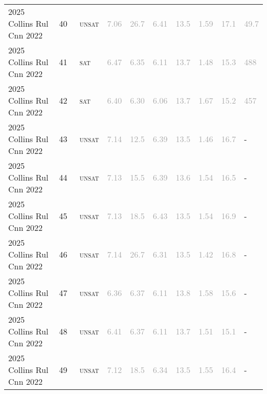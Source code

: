 \begin{center}
{\begin{longtable}{@{}llllllllll@{}}
2025 Collins Rul Cnn 2022 & 40 & ~\textsc{unsat} & \textcolor{darkgray}{7.06} & \textcolor{darkgray}{26.7} & \textcolor{darkgray}{6.41} & \textcolor{darkgray}{13.5} & \textcolor{darkgray}{1.59} & \textcolor{darkgray}{17.1} & \textcolor{darkgray}{49.7} \\
2025 Collins Rul Cnn 2022 & 41 & ~\textsc{sat} & \textcolor{darkgray}{6.47} & \textcolor{darkgray}{6.35} & \textcolor{darkgray}{6.11} & \textcolor{darkgray}{13.7} & \textcolor{darkgray}{1.48} & \textcolor{darkgray}{15.3} & \textcolor{darkgray}{488} \\
2025 Collins Rul Cnn 2022 & 42 & ~\textsc{sat} & \textcolor{darkgray}{6.40} & \textcolor{darkgray}{6.30} & \textcolor{darkgray}{6.06} & \textcolor{darkgray}{13.7} & \textcolor{darkgray}{1.67} & \textcolor{darkgray}{15.2} & \textcolor{darkgray}{457} \\
2025 Collins Rul Cnn 2022 & 43 & ~\textsc{unsat} & \textcolor{darkgray}{7.14} & \textcolor{darkgray}{12.5} & \textcolor{darkgray}{6.39} & \textcolor{darkgray}{13.5} & \textcolor{darkgray}{1.46} & \textcolor{darkgray}{16.7} & - \\
2025 Collins Rul Cnn 2022 & 44 & ~\textsc{unsat} & \textcolor{darkgray}{7.13} & \textcolor{darkgray}{15.5} & \textcolor{darkgray}{6.39} & \textcolor{darkgray}{13.6} & \textcolor{darkgray}{1.54} & \textcolor{darkgray}{16.5} & - \\
2025 Collins Rul Cnn 2022 & 45 & ~\textsc{unsat} & \textcolor{darkgray}{7.13} & \textcolor{darkgray}{18.5} & \textcolor{darkgray}{6.43} & \textcolor{darkgray}{13.5} & \textcolor{darkgray}{1.54} & \textcolor{darkgray}{16.9} & - \\
2025 Collins Rul Cnn 2022 & 46 & ~\textsc{unsat} & \textcolor{darkgray}{7.14} & \textcolor{darkgray}{26.7} & \textcolor{darkgray}{6.31} & \textcolor{darkgray}{13.5} & \textcolor{darkgray}{1.42} & \textcolor{darkgray}{16.8} & - \\
2025 Collins Rul Cnn 2022 & 47 & ~\textsc{unsat} & \textcolor{darkgray}{6.36} & \textcolor{darkgray}{6.37} & \textcolor{darkgray}{6.11} & \textcolor{darkgray}{13.8} & \textcolor{darkgray}{1.58} & \textcolor{darkgray}{15.6} & - \\
2025 Collins Rul Cnn 2022 & 48 & ~\textsc{unsat} & \textcolor{darkgray}{6.41} & \textcolor{darkgray}{6.37} & \textcolor{darkgray}{6.11} & \textcolor{darkgray}{13.7} & \textcolor{darkgray}{1.51} & \textcolor{darkgray}{15.1} & - \\
2025 Collins Rul Cnn 2022 & 49 & ~\textsc{unsat} & \textcolor{darkgray}{7.12} & \textcolor{darkgray}{18.5} & \textcolor{darkgray}{6.34} & \textcolor{darkgray}{13.5} & \textcolor{darkgray}{1.55} & \textcolor{darkgray}{16.4} & - \\

\end{longtable}}
\end{center}
